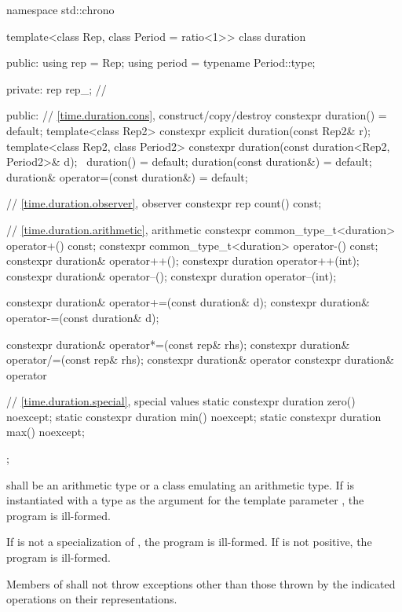 %
\begin{codeblock}
namespace std::chrono {
  template<class Rep, class Period = ratio<1>>
  class duration {
  public:
    using rep    = Rep;
    using period = typename Period::type;

  private:
    rep rep_;       // \expos

  public:
    // \ref{time.duration.cons}, construct/copy/destroy
    constexpr duration() = default;
    template<class Rep2>
      constexpr explicit duration(const Rep2& r);
    template<class Rep2, class Period2>
      constexpr duration(const duration<Rep2, Period2>& d);
    ~duration() = default;
    duration(const duration&) = default;
    duration& operator=(const duration&) = default;

    // \ref{time.duration.observer}, observer
    constexpr rep count() const;

    // \ref{time.duration.arithmetic}, arithmetic
    constexpr common_type_t<duration> operator+() const;
    constexpr common_type_t<duration> operator-() const;
    constexpr duration& operator++();
    constexpr duration  operator++(int);
    constexpr duration& operator--();
    constexpr duration  operator--(int);

    constexpr duration& operator+=(const duration& d);
    constexpr duration& operator-=(const duration& d);

    constexpr duration& operator*=(const rep& rhs);
    constexpr duration& operator/=(const rep& rhs);
    constexpr duration& operator%
    constexpr duration& operator%

    // \ref{time.duration.special}, special values
    static constexpr duration zero() noexcept;
    static constexpr duration min() noexcept;
    static constexpr duration max() noexcept;
  };
}
\end{codeblock}

\pnum
{} shall be an arithmetic type or a class emulating an arithmetic type.
If  is instantiated with a  type as the argument for the template
parameter , the program is ill-formed.

\pnum
If  is not a specialization of , the program is ill-formed.
If  is not positive, the program is ill-formed.

\pnum
Members of  shall not throw exceptions other than
those thrown by the indicated operations on their representations.

